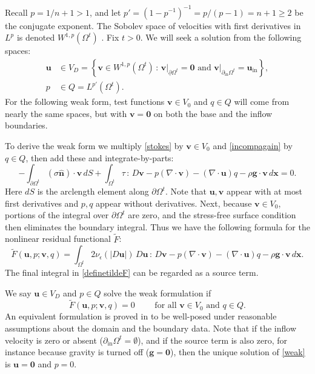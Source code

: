 \documentclass[letterpaper,final,12pt,reqno]{amsart}
\newcommand{\eps}{\epsilon}
\newcommand{\hbn}{\hat{\mathbf{n}}}
\newcommand{\bg}{\mathbf{g}}
\newcommand{\bu}{\mathbf{u}}
\newcommand{\bv}{\mathbf{v}}
\newcommand{\bx}{\mathbf{x}}
\newcommand{\bzero}{\bm{0}}
\begin{document}
Recall $p=1/n + 1>1$, and let $p'=(1-p^{-1})^{-1}=p/(p-1)=n+1\ge 2$ be the conjugate exponent.  The Sobolev space of velocities with first derivatives in $L^p$ is denoted $W^{1,p}(\Omega^t)$ \cite{Evans2010}.  Fix $t>0$.  We will seek a solution from the following spaces:
\begin{align*}
\bu &\in V_D = \left\{\bv \in W^{1,p}(\Omega^t)\,:\,\bv\big|_{\underline{\partial} \Omega^t}=\bzero \text{ and } \bv\big|_{\partial_{\text{in}} \Omega^t} = \bu_{\text{in}}\right\}, \\
p &\in Q =L^{p'}(\Omega^t).
\end{align*}
For the following weak form, test functions $\bv \in V_0$ and $q\in Q$ will come from nearly the same spaces, but with $\bv=\bzero$ on both the base and the inflow boundaries.

To derive the weak form we multiply \eqref{stokes} by $\bv\in V_0$ and \eqref{incompagain} by $q\in Q$, then add these and integrate-by-parts:
\begin{equation}
-\int_{\partial\Omega^t} (\sigma \hbn)\cdot \bv\,dS + \int_{\Omega^t} \tau \,:\,D\bv - p (\nabla \cdot \bv) - \left(\nabla \cdot \bu\right) q - \rho \mathbf{g} \cdot \bv \,d\bx = 0. \label{nonfunctwo}
\end{equation}
Here $dS$ is the arclength element along $\partial\Omega^t$.  Note that $\bu,\bv$ appear with at most first derivatives and $p,q$ appear without derivatives.  Next, because $\bv\in V_0$, portions of the integral over $\partial\Omega^t$ are zero, and the stress-free surface condition then eliminates the boundary integral.  Thus we have the following formula for the nonlinear residual functional $\tilde F$:
\begin{equation}
\tilde F(\bu,p;\bv,q) = \int_{\Omega^t} 2 \nu_\eps(|D\bu|)\, D\bu\,:\,D\bv - p (\nabla \cdot \bv) - \left(\nabla \cdot \bu\right) q - \rho \mathbf{g} \cdot \bv \,d\bx. \label{definetildeF}
\end{equation}
The final integral in \eqref{definetildeF} can be regarded as a source term.

We say $\bu\in V_D$ and $p\in Q$ solve the weak formulation if
\begin{equation}
\tilde F(\bu,p;\bv,q) = 0 \qquad \text{ for all } \bv\in V_0 \text{ and } q\in Q.  \label{weak}
\end{equation}
An equivalent formulation is proved in \cite[Theorem 3.8]{JouvetRappaz2011} to be well-posed under reasonable assumptions about the domain and the boundary data.  Note that if the inflow velocity is zero or absent ($\partial_{\text{in}} \Omega^t = \emptyset$), and if the source term is also zero, for instance because gravity is turned off ($\bg=\bzero$), then the unique solution of \eqref{weak} is $\bu=\bzero$ and $p=0$.
\end{document}
